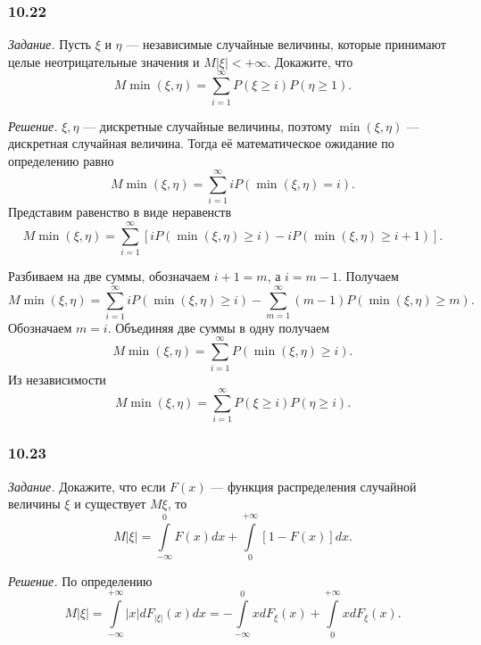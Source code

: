 \subsubsection*{10.22}

\textit{Задание.} Пусть $ \xi $ и $ \eta $ --- независимые случайные величины, которые принимают целые неотрицательные значения и $M \left| \xi \right| < + \infty $.
Докажите, что
$$M \min \left( \xi, \eta \right) =
\sum \limits_{i=1}^{ \infty } P \left( \xi \geq i \right) P \left( \eta \geq 1 \right).$$

\textit{Решение.} $ \xi, \eta $ --- дискретные случайные величины, поэтому $ \min \left( \xi, \eta \right) $ --- дискретная случайная величина.
Тогда её математическое ожидание по определению равно
$$M \min \left( \xi, \eta \right) =
\sum \limits_{i=1}^{ \infty } iP \left( \min \left( \xi, \eta \right) = i \right).$$
Представим равенство в виде неравенств
$$M \min \left( \xi, \eta \right) =
\sum \limits_{i=1}^{ \infty } \left[ iP \left( \min \left( \xi, \eta \right) \geq i \right) -
iP \left( \min \left( \xi, \eta \right) \geq i + 1 \right) \right].$$

Разбиваем на две суммы, обозначаем $i + 1 = m$, а $i = m - 1$.
Получаем
$$M \min \left( \xi, \eta \right) =
\sum \limits_{i=1}^{ \infty } iP \left( \min \left( \xi, \eta \right) \geq i \right) -
\sum \limits_{m=1}^{ \infty } \left( m-1 \right) P \left( \min \left( \xi, \eta \right) \geq m \right).$$
Обозначаем $m = i$.
Объединяя две суммы в одну получаем
$$M \min \left( \xi, \eta \right) =
\sum \limits_{i=1}^{ \infty } P \left( \min \left( \xi, \eta \right) \geq i \right).$$
Из независимости
$$M \min \left( \xi, \eta \right) =
\sum \limits_{i=1}^{ \infty } P \left( \xi \geq i \right) P \left( \eta \geq i \right).$$

\subsubsection*{10.23}

\textit{Задание.} Докажите, что если $F \left( x \right) $ --- функция распределения случайной величины $ \xi $ и существует $M \xi $, то
$$M \left| \xi \right| =
\int \limits_{- \infty }^0 F \left( x \right) dx + \int \limits_0^{+ \infty } \left[ 1 - F \left( x \right) \right] dx.$$

\textit{Решение.} По определению
$$M \left| \xi \right| =
\int \limits_{- \infty }^{+ \infty } \left| x \right| dF_{ \left| \xi \right| } \left( x \right) dx =
- \int \limits_{- \infty }^0 xdF_{ \xi } \left( x \right) + \int \limits_0^{+ \infty } xdF_{ \xi } \left( x \right).$$


